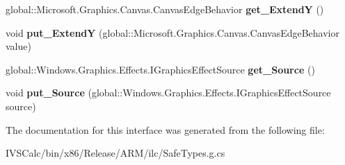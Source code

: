\begin{DoxyCompactItemize}
global\+::\+Microsoft.\+Graphics.\+Canvas.\+Canvas\+Edge\+Behavior {\bfseries get\+\_\+\+ExtendY} ()
\item 
\mbox{\label{interface_microsoft_1_1_graphics_1_1_canvas_1_1_effects_1_1_i_border_effect_a372972f65ae9a42601613acb61241a6d}} 
void {\bfseries put\+\_\+\+ExtendY} (global\+::\+Microsoft.\+Graphics.\+Canvas.\+Canvas\+Edge\+Behavior value)
\item 
\mbox{\label{interface_microsoft_1_1_graphics_1_1_canvas_1_1_effects_1_1_i_border_effect_a2455f124b6e073f2b70aa6c68d5bc616}} 
global\+::\+Windows.\+Graphics.\+Effects.\+I\+Graphics\+Effect\+Source {\bfseries get\+\_\+\+Source} ()
\item 
\mbox{\label{interface_microsoft_1_1_graphics_1_1_canvas_1_1_effects_1_1_i_border_effect_a7d1e465d73b86e93f93e8df97f29f492}} 
void {\bfseries put\+\_\+\+Source} (global\+::\+Windows.\+Graphics.\+Effects.\+I\+Graphics\+Effect\+Source source)
\end{DoxyCompactItemize}


The documentation for this interface was generated from the following file\+:\begin{DoxyCompactItemize}
\item 
I\+V\+S\+Calc/bin/x86/\+Release/\+A\+R\+M/ilc/Safe\+Types.\+g.\+cs\end{DoxyCompactItemize}
